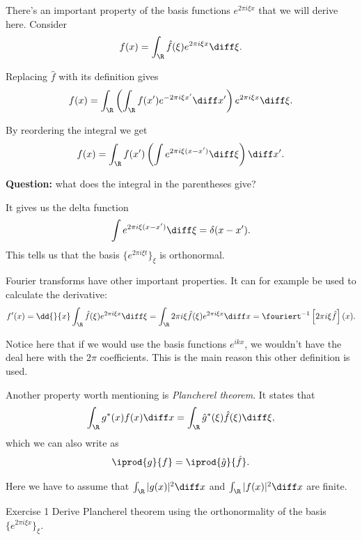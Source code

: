 \begin{frame}
	There's an important property of the basis functions $ e^{2\pi i \xi x} $ that we will derive here. 
	Consider 
	\[ f(x) = \int_{\R} \hat{f}(\xi) e^{2\pi i \xi x} \diff \xi. \]
	
	\pause
	Replacing  $ \hat{f} $ with its definition gives 
	\[ f(x) = \int_{\R} \left( \int_\R f(x') e^{-2\pi i \xi x'} \diff x'  \right) e^{2\pi i \xi x} \diff \xi. \]
	
	\pause
	By reordering the integral we get 
	\[ f(x) = \int_\R f(x') \left( \int e^{2\pi i \xi (x-x')} \diff \xi \right) \diff x'. \]
	
	\pause
	\textbf{Question:} what does the integral in the parentheses give?
	
	\pause
	It gives us the delta function
	\[ \int e^{2\pi i \xi (x-x')} \diff \xi = \delta(x-x'). \]
	This tells us that the basis $ \{ e^{2\pi i \xi t}\}_\xi $ is orthonormal. 
\end{frame}

\begin{frame}
	Fourier transforms have other important properties. It can for example be used to calculate the derivative:
	\[ f'(x) = \dd{}{x} \int_{\R} \hat{f}(\xi) e^{2\pi i \xi x} \diff \xi = \int_\R 2\pi i \xi \hat{f}(\xi) e^{2\pi i \xi x} \diff x = \fouriert^{-1}\left[2\pi i \xi \hat{f} \right](x). \]
	
	\pause
	Notice here that if we would use the basis functions $ e^{i k x} $, we wouldn't have the deal here with the $ 2\pi $ coefficients. This is the main reason this other definition is used. 
	
	\pause
	Another property worth mentioning is \emph{Plancherel theorem}. It states that 
	\[ \int_{\R} g^*(x) f(x) \diff x = \int_{\R} \hat{g}^{*}(\xi) \hat{f}(\xi) \diff \xi, \]
	which we can also write as 
	\[ \iprod{g}{f} = \iprod{\hat{g}}{\hat{f}}. \]
	
	{\color{olive} Here we have to assume that $ \int_{\R} |g(x)|^2 \diff x $ and $ \int_{\R} |f(x)|^2 \diff x $ are finite. }
\end{frame}

\begin{frame}{Exercise 1}
	Derive Plancherel theorem using the orthonormality of the basis $ \{ e^{2\pi i \xi x} \}_\xi. $
\end{frame}


